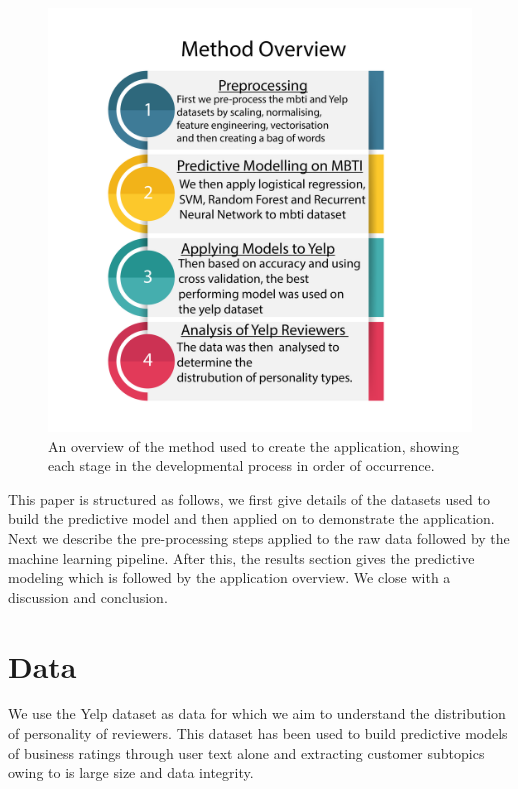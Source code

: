 \documentclass[sigconf, nonacm]{acmart}
\begin{document}
\begin{figure}
\includegraphics[width= 0.9\columnwidth]{Methodology_fig.pdf}
\caption{An overview of the method used to create the application, showing each stage in the developmental process in order of occurrence. }
\label{method_fig}
\end{figure}

This paper is structured as follows, we first give details of the datasets used to build the predictive model and then applied on to demonstrate the application. Next we describe the pre-processing steps applied to the raw data followed by the machine learning pipeline. After this, the results section gives the predictive modeling which is followed by the application overview. We close with a discussion and conclusion. 



\section{Data}

We use the Yelp dataset \cite{challenge2013yelp} as data for which we aim to understand the distribution of personality of reviewers. This dataset has been used to build predictive models of business ratings through user text alone \cite{fan2014predicting} and extracting customer subtopics \cite{huang2014improving} owing to is large size and data integrity.  \\
\end{document}
